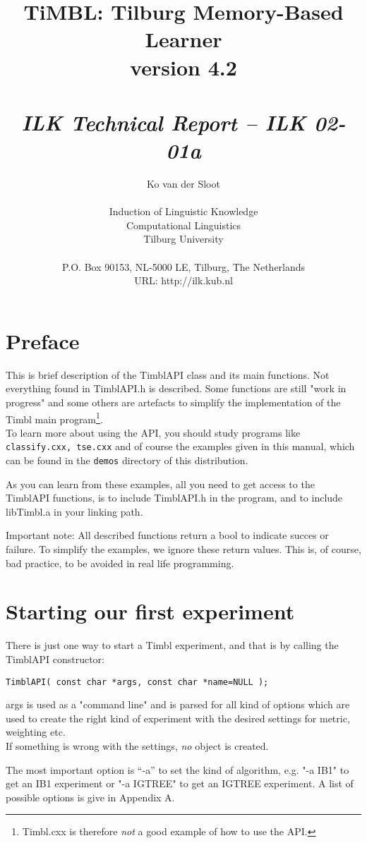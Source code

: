 \documentclass{article}
\author{Ko van der Sloot\\ \ \\ Induction of Linguistic Knowledge\\
        Computational Linguistics\\ Tilburg University \\ \ \\
        P.O. Box 90153, NL-5000 LE, Tilburg, The Netherlands \\ URL:
        http://ilk.kub.nl}
\title{{\huge TiMBL: Tilburg Memory-Based Learner} \\ \vspace*{0.5cm}
{\bf version 4.2} \\ \vspace*{0.5cm}{\huge API Reference Guide}\\
\vspace*{1cm} {\it ILK Technical Report -- ILK 02-01a}}
\begin{document}
\maketitle

\clearpage
\section{Preface}

This is brief description of the TimblAPI class and its main functions.
Not everything found in TimblAPI.h is described. Some functions are
still "work in progress" and some others are artefacts to simplify the
implementation of the Timbl main program\footnote{Timbl.cxx is
therefore {\em not} a good example of how to use the API.}. \\
To learn more about using the API, you should study programs like 
{\tt classify.cxx, tse.cxx} and of course the examples given in this
manual, which can be found in the {\tt demos} directory of this
distribution. 

As you can learn from these examples, all you need to get access to the
TimblAPI functions, is to include TimblAPI.h in the program, and to
include libTimbl.a in your linking path. 

Important note: All described functions return a bool to indicate
succes or failure. To simplify the examples, we ignore these return
values. This is, of course, bad practice, to be avoided in
real life programming.

\section{Starting our first experiment}

There is just one way to start a Timbl experiment, and that is by
calling the TimblAPI constructor:

\begin{verbatim}
TimblAPI( const char *args, const char *name=NULL );
\end{verbatim}

args is used as a "command line" and is parsed for all kind of
options which are used to create the right kind of experiment with the
desired settings for metric, weighting etc.\\
If something is wrong with the settings, {\em no} object is created.

The most important option is ``-a''  to set the kind of algorithm,
e.g. "-a IB1" to get an IB1 experiment or "-a IGTREE" to get an IGTREE
experiment. A list of possible options is give in Appendix A.\\
\end{document}
